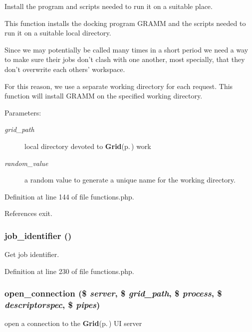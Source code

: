 Install the program and scripts needed to run it on a suitable place. 

This function installs the docking program GRAMM and the scripts needed to run it on a suitable local directory.

Since we may potentially be called many times in a short period we need a way to make sure their jobs don't clash with one another, most specially, that they don't overwrite each others' workspace.

For this reason, we use a separate working directory for each request. This function will install GRAMM on the specified working directory.

\begin{Desc}
\item[Parameters:]
\begin{description}
\item[{\em grid\_\-path}]local directory devoted to {\bf Grid}{\rm (p.\,\pageref{classGrid})} work \item[{\em random\_\-value}]a random value to generate a unique name for the working directory. \end{description}
\end{Desc}


Definition at line 144 of file functions.php.

References exit.
\subsubsection{\setlength{\rightskip}{0pt plus 5cm}job\_\-identifier ()}\label{functions_8php_a5}


Get job identifier. 



Definition at line 230 of file functions.php.
\subsubsection{\setlength{\rightskip}{0pt plus 5cm}open\_\-connection (\$ {\em server}, \$ {\em grid\_\-path}, \$ {\em process}, \$ {\em descriptorspec}, \$ {\em pipes})}\label{functions_8php_a0}


open a connection to the {\bf Grid}{\rm (p.\,\pageref{classGrid})} UI server 

